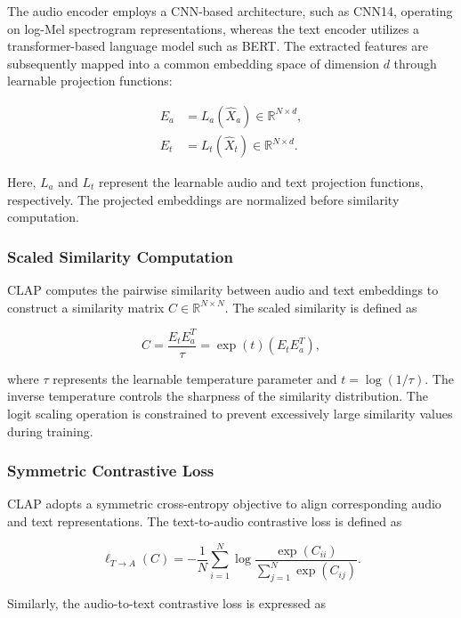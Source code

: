 \documentclass[pdflatex,sn-mathphys-num]{sn-jnl}%
\theoremstyle{thmstyleone}%
\theoremstyle{thmstyletwo}%
\theoremstyle{thmstylethree}%
\begin{document}
The audio encoder employs a CNN-based architecture, such as CNN14, operating on log-Mel spectrogram representations, whereas the text encoder utilizes a transformer-based language model such as BERT. The extracted features are subsequently mapped into a common embedding space of dimension $d$ through learnable projection functions:

\begin{align}
E_a &= L_a(\hat{X}_a)
\in \mathbb{R}^{N \times d}, \\
E_t &= L_t(\hat{X}_t)
\in \mathbb{R}^{N \times d}.
\end{align}

Here, $L_a$ and $L_t$ represent the learnable audio and text projection functions, respectively. The projected embeddings are normalized before similarity computation.

\subsubsection{Scaled Similarity Computation}

CLAP computes the pairwise similarity between audio and text embeddings to construct a similarity matrix $C \in \mathbb{R}^{N \times N}$. The scaled similarity is defined as

\begin{equation}
C = \frac{E_t E_a^T}{\tau}
= \exp(t)(E_t E_a^T),
\label{eq:clap_similarity}
\end{equation}

where $\tau$ represents the learnable temperature parameter and $t=\log(1/\tau)$. The inverse temperature controls the sharpness of the similarity distribution. The logit scaling operation is constrained to prevent excessively large similarity values during training.

\subsubsection{Symmetric Contrastive Loss}

CLAP adopts a symmetric cross-entropy objective to align corresponding audio and text representations. The text-to-audio contrastive loss is defined as

\begin{equation}
\ell_{T \rightarrow A}(C)
=
-\frac{1}{N}
\sum_{i=1}^{N}
\log
\frac{\exp(C_{ii})}
{\sum_{j=1}^{N}\exp(C_{ij})}.
\label{eq:clap_t2a}
\end{equation}

Similarly, the audio-to-text contrastive loss is expressed as
\end{document}
